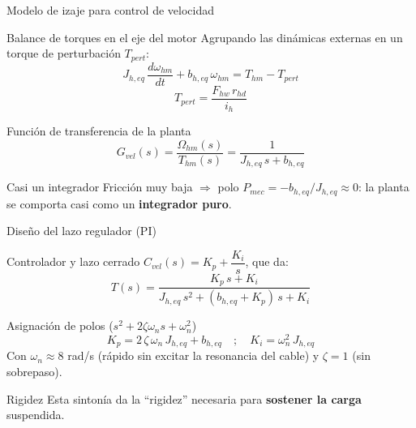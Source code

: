 \begin{frame}{Modelo de izaje para control de velocidad}
  \begin{block}{Balance de torques en el eje del motor}
    Agrupando las dinámicas externas en un torque de perturbación $T_{pert}$:
    \[
    J_{h,eq}\,\frac{d\omega_{hm}}{dt} + b_{h,eq}\,\omega_{hm} = T_{hm} - T_{pert}
    \]
    \[
    T_{pert} = \frac{F_{hw}\,r_{hd}}{i_h}
    \]
  \end{block}

  \vspace{-0.1cm}
  \begin{block}{Función de transferencia de la planta}
    \[
    G_{vel}(s) = \frac{\Omega_{hm}(s)}{T_{hm}(s)} = \frac{1}{J_{h,eq}\,s + b_{h,eq}}
    \]
  \end{block}

  \begin{alertblock}{Casi un integrador}
    Fricción muy baja $\Rightarrow$ polo $P_{mec}=-b_{h,eq}/J_{h,eq}\approx 0$: la planta se
    comporta casi como un \textbf{integrador puro}.
  \end{alertblock}
\end{frame}

\begin{frame}{Diseño del lazo regulador (PI)}
  \begin{block}{Controlador y lazo cerrado}
    $C_{vel}(s) = K_p + \dfrac{K_i}{s}$, que da:
    \[
    T(s) = \frac{K_p\,s + K_i}{J_{h,eq}\,s^2 + (b_{h,eq}+K_p)\,s + K_i}
    \]
  \end{block}

  \vspace{-0.1cm}
  \begin{block}{Asignación de polos ($s^2+2\zeta\omega_n s+\omega_n^2$)}
    \[
    K_p = 2\,\zeta\,\omega_n\,J_{h,eq} + b_{h,eq} \quad ; \quad K_i = \omega_n^2\,J_{h,eq}
    \]
    Con $\omega_n \approx 8$ rad/s (rápido sin excitar la resonancia del cable) y $\zeta = 1$
    (sin sobrepaso).
  \end{block}

  \begin{alertblock}{Rigidez}
    Esta sintonía da la ``rigidez'' necesaria para \textbf{sostener la carga} suspendida.
  \end{alertblock}
\end{frame}

